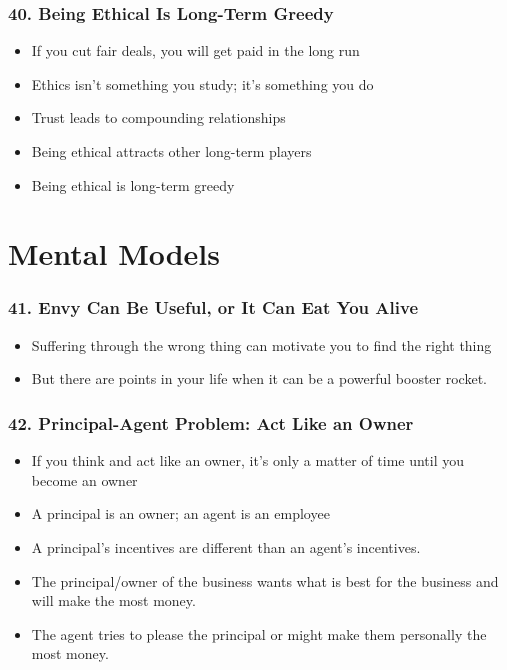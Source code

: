 \begin{frame}[fragile]
\frametitle{40. Being Ethical Is Long-Term Greedy}
\begin{itemize}
\item If you cut fair deals, you will get paid in the long run
\item Ethics isn't something you study; it's something you do
\item Trust leads to compounding relationships
\item Being ethical attracts other long-term players
\item Being ethical is long-term greedy
\end{itemize}
\end{frame}

\section{Mental Models}

\begin{frame}[fragile]
\frametitle{41. Envy Can Be Useful, or It Can Eat You Alive}
\begin{itemize}
\item Suffering through the wrong thing can motivate you to  find the right thing
\item But there are points in your life when it can be a powerful booster rocket.
\end{itemize}
\end{frame}

\begin{frame}[fragile]
\frametitle{42. Principal-Agent Problem: Act Like an Owner}
\begin{itemize}
\item If you think and act like an owner, it's only a matter of time until you become an owner
\item A principal is an owner; an agent is an employee
\item A principal's incentives are different than an agent's incentives.
\item The principal/owner of the business wants what is best for the business and will make the most money. 
\item  The agent tries to please the principal or might make them personally the most money.
\end{itemize}
\end{frame}


